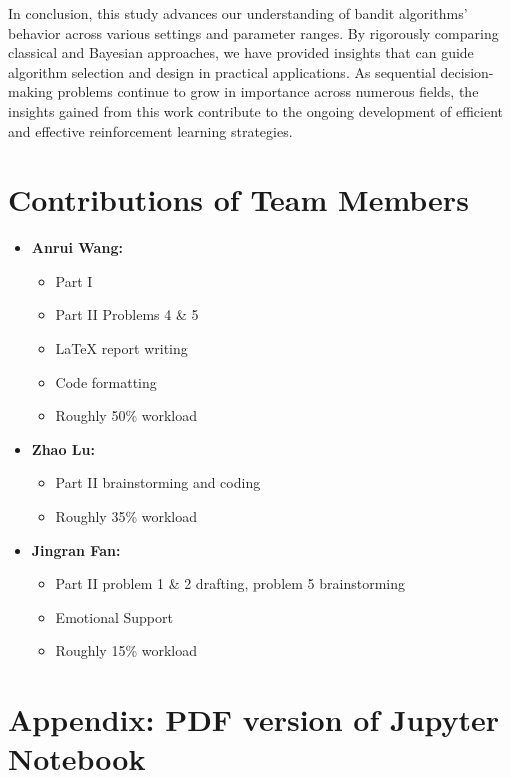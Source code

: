 \documentclass[11pt]{article}
\begin{document}
In conclusion, this study advances our understanding of bandit algorithms' behavior across various settings and parameter ranges. By rigorously comparing classical and Bayesian approaches, we have provided insights that can guide algorithm selection and design in practical applications. As sequential decision-making problems continue to grow in importance across numerous fields, the insights gained from this work contribute to the ongoing development of efficient and effective reinforcement learning strategies.

\newpage
\section{Contributions of Team Members}
\begin{itemize}
    \item \textbf{Anrui Wang:} 
        \begin{itemize}
            \item Part I
            \item Part II Problems 4 \& 5
            \item \LaTeX{} report writing
            \item Code formatting
            \item Roughly 50\% workload
        \end{itemize}
    
    \item \textbf{Zhao Lu:} 
        \begin{itemize}
            \item Part II brainstorming and coding
            \item Roughly 35\% workload
        \end{itemize}
    
    \item \textbf{Jingran Fan:} 
        \begin{itemize}
            \item Part II problem 1 \& 2 drafting, problem 5 brainstorming
            \item Emotional Support
            \item Roughly 15\% workload
        \end{itemize}
\end{itemize}

\newpage
\section{Appendix: PDF version of Jupyter Notebook}
\end{document}

